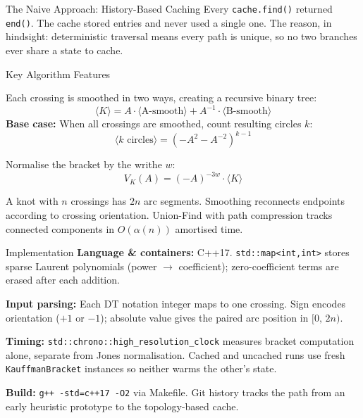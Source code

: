 \documentclass[final]{beamer}
\newlength{\colwidth}
\begin{document}
\begin{frame}[t,fragile]
\begin{columns}[t]
\begin{column}{\colwidth}
\begin{alertblock}{The Naive Approach: History-Based Caching}
    \vspace{0.1cm}
    Every \texttt{cache.find()} returned \texttt{end()}. The cache stored entries and never used a single one. The reason, in hindsight: deterministic traversal means every path is unique, so no two branches ever share a state to cache.
  \end{alertblock}

  \begin{block}{Key Algorithm Features}
    
    Each crossing is smoothed in two ways, creating a recursive binary tree:
    \[
      \langle K \rangle = A\cdot\langle \text{A-smooth} \rangle + A^{-1}\cdot\langle \text{B-smooth} \rangle
    \]
    \textbf{Base case:} When all crossings are smoothed, count resulting circles $k$:
    \[
      \langle k\text{ circles}\rangle = (-A^2 - A^{-2})^{k-1}
    \]


    Normalise the bracket by the writhe $w$:
    \[
      V_K(A) = (-A)^{-3w}\cdot\langle K\rangle
    \]


    A knot with $n$ crossings has $2n$ arc segments. Smoothing reconnects endpoints according to crossing orientation. Union-Find with path compression tracks connected components in $O(\alpha(n))$ amortised time.
  \end{block}

  \begin{block}{Implementation}
    \textbf{Language \& containers:} C++17. \texttt{std::map<int,int>} stores sparse Laurent polynomials (power $\to$ coefficient); zero-coefficient terms are erased after each addition.

    \vspace{0.1cm}
    \textbf{Input parsing:} Each DT notation integer maps to one crossing. Sign encodes orientation ($+1$ or $-1$); absolute value gives the paired arc position in $[0,\,2n)$.

    \vspace{0.1cm}
    \textbf{Timing:} \texttt{std::chrono::high\_resolution\_clock} measures bracket computation alone, separate from Jones normalisation. Cached and uncached runs use fresh \texttt{KauffmanBracket} instances so neither warms the other's state.

    \vspace{0.1cm}
    \textbf{Build:} \texttt{g++ -std=c++17 -O2} via Makefile. Git history tracks the path from an early heuristic prototype to the topology-based cache.
  \end{block}


\end{column}
\end{columns}
\end{frame}
\end{document}
